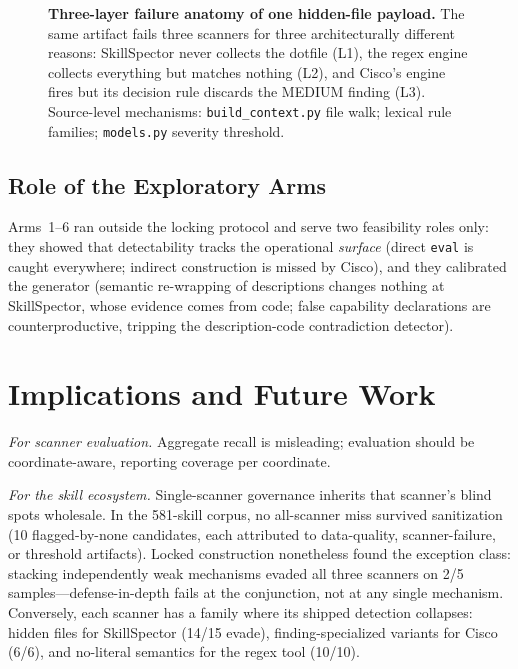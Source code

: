 \documentclass[sigconf,nonacm]{acmart}
\begin{document}
\begin{figure}[t]
\caption{\textbf{Three-layer failure anatomy of one hidden-file payload.} The same artifact fails three scanners for three architecturally different reasons: SkillSpector never collects the dotfile (L1), the regex engine collects everything but matches nothing (L2), and Cisco's engine fires but its decision rule discards the MEDIUM finding (L3). Source-level mechanisms: \texttt{build\_context.py} file walk; lexical rule families; \texttt{models.py} severity threshold.}
\label{fig:oneload}
\end{figure}

\subsection{Role of the Exploratory Arms}
Arms~1--6 ran outside the locking protocol and serve two feasibility roles only: they showed that detectability tracks the operational \emph{surface} (direct \texttt{eval} is caught everywhere; indirect construction is missed by Cisco), and they calibrated the generator (semantic re-wrapping of descriptions changes nothing at SkillSpector, whose evidence comes from code; false capability declarations are counterproductive, tripping the description-code contradiction detector).



\section{Implications and Future Work}
\label{sec:implications}

\emph{For scanner evaluation.} Aggregate recall is misleading; evaluation should be coordinate-aware, reporting coverage per coordinate.

\emph{For the skill ecosystem.} Single-scanner governance inherits that scanner's blind spots wholesale. In the 581-skill corpus, no all-scanner miss survived sanitization (10 flagged-by-none candidates, each attributed to data-quality, scanner-failure, or threshold artifacts). Locked construction nonetheless found the exception class: stacking independently weak mechanisms evaded all three scanners on 2/5 samples---defense-in-depth fails at the conjunction, not at any single mechanism. Conversely, each scanner has a family where its shipped detection collapses: hidden files for SkillSpector (14/15 evade), finding-specialized variants for Cisco (6/6), and no-literal semantics for the regex tool (10/10).
\end{document}
